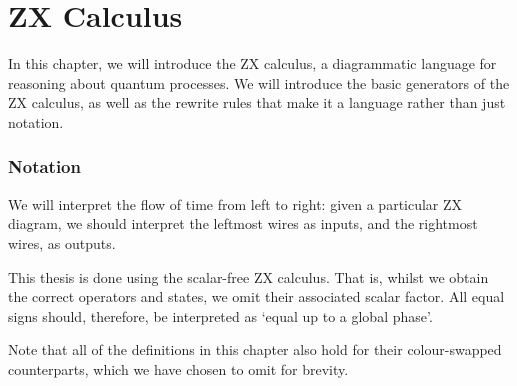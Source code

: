 \chapter{ZX Calculus}%
\label{zx-calculus}

In this chapter, we will introduce the ZX calculus, a diagrammatic language for reasoning about quantum processes. We will introduce the basic generators of the ZX calculus, as well as the rewrite rules that make it a language rather than just notation. 

\subsection{Notation}

We will interpret the flow of time from left to right: given a particular ZX diagram, we should interpret the leftmost wires as inputs, and the rightmost wires, as outputs.

This thesis is done using the scalar-free ZX calculus. That is, whilst we obtain the correct operators and states, we omit their associated scalar factor. All equal signs should, therefore, be interpreted as `equal up to a global phase'.

Note that all of the definitions in this chapter also hold for their colour-swapped counterparts, which we have chosen to omit for brevity.
